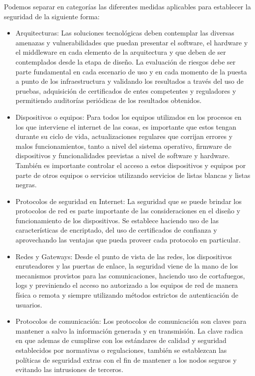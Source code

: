 Podemos separar en categorías las diferentes medidas aplicables para establecer la seguridad de la siguiente forma:

\begin{itemize}
\item Arquitecturas: Las soluciones tecnológicas deben contemplar las diversas amenazas y vulnerabilidades que puedan presentar el software, el hardware y el middleware en cada elemento de la arquitectura y que deben de ser contemplados desde la etapa de diseño. La evaluación de riesgos debe ser parte fundamental en cada escenario de uso y en cada momento de la puesta a punto de los infraestructura y validando los resultados a través del uso de pruebas, adquisición de certificados de entes competentes y reguladores y permitiendo auditorías periódicas de los resultados obtenidos.
\item Dispositivos o equipos: Para todos los equipos utilizados en los procesos en los que interviene el internet de las cosas, es importante que estos tengan durante su ciclo de vida, actualizaciones regulares que corrijan errores y malos funcionamientos, tanto a nivel del sistema operativo, firmware de dispositivos y funcionalidades previstas a nivel de software y hardware. También es importante controlar el acceso a estos dispositivos y equipos por parte de otros equipos o servicios utilizando servicios de listas blancas y listas negras.
\item Protocolos de seguridad en Internet: La seguridad que se puede brindar los protocolos de red es parte importante de las consideraciones en el diseño y funcionamiento de los dispositivos. Se establece haciendo uso de las características de encriptado, del uso de certificados de confianza y aprovechando las ventajas que pueda proveer cada protocolo en particular.  
\item Redes y Gateways: Desde el punto de vista de las redes, los dispositivos enruteadores y las puertas de enlace, la seguridad viene de la mano de los mecanismos provistos para las comunicaciones, haciendo uso de cortafuegos, logs y previniendo el acceso no autorizado a los equipos de red de manera física o remota y siempre utilizando métodos estrictos de autenticación de usuarios.
\item Protocolos de comunicación: Los protocolos de comunicación son claves para mantener a salvo la información generada y en transmisión. La clave radica en que ademas de cumplirse con los estándares de calidad y seguridad establecidos por normativas o regulaciones, también se establezcan las políticas de seguridad extras con el fin de mantener a los nodos seguros y evitando las intrusiones de terceros.

\end{itemize}
